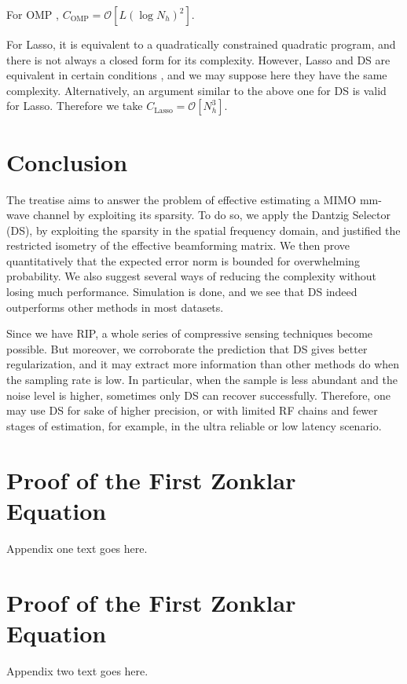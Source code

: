\documentclass[journal]{IEEEtran}
\newcommand {\m} [1] {\( #1 \)}
\newcommand {\RB} [1] {\left( #1 \right)}
\newcommand {\SB} [1] {\left[ #1 \right]}
\begin{document}
{For OMP \cite {TrG07}, \m {C_{\mathrm {OMP}} =\mathcal {O} \SB {L \RB {\log N_h} ^2}}.

For Lasso, it is equivalent to a quadratically constrained quadratic program, and there is not always a closed form for its complexity.
However, Lasso and DS are equivalent in certain conditions \cite {AsR10}, and we may suppose here they have the same complexity.
Alternatively, an argument similar to the above one for DS is valid for Lasso.
Therefore we take \m {C_{\mathrm {Lasso}} =\mathcal {O} \SB {N_h ^3}}.



\section{Conclusion}

The treatise aims to answer the problem of effective estimating a MIMO mm-wave channel by exploiting its sparsity.
To do so, we apply the Dantzig Selector (DS), by exploiting the sparsity in the spatial frequency domain, and justified the restricted isometry of the effective beamforming matrix.
We then prove quantitatively that the expected error norm is bounded for overwhelming probability.
We also suggest several ways of reducing the complexity without losing much performance.
Simulation is done, and we see that DS indeed outperforms other methods in most datasets.

Since we have RIP, a whole series of compressive sensing techniques become possible.
But moreover, we corroborate the prediction that DS gives better regularization, and it may extract more information than other methods do when the sampling rate is low.
In particular, when the sample is less abundant and the noise level is higher, sometimes only DS can recover successfully.
Therefore, one may use DS for sake of higher precision, or with limited RF chains and fewer stages of estimation, for example, in the ultra reliable or low latency scenario.


\appendices
\section{Proof of the First Zonklar Equation}
Appendix one text goes here.

\section{Proof of the First Zonklar Equation}
Appendix two text goes here.


}
\end{document}
